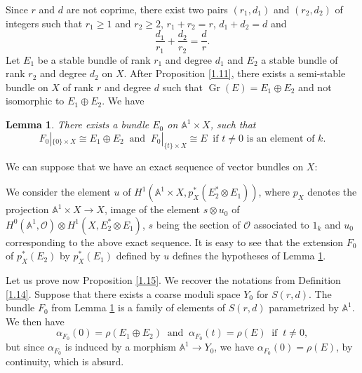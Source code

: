 \documentclass[12pt,a4paper]{book}
\DeclareMathOperator\Gr{Gr}
\def\OO{\mathscr{O}}
\newtheorem{lemma}[thm]{Lemma}
\theoremstyle{definition} \newtheorem{defn}[thm]{Definition}
\theoremstyle{definition} \newtheorem{ejs}[thm]{Examples}
\theoremstyle{definition} \newtheorem{ej}[thm]{Example}
\begin{document}
    Since $r$ and $d$ are not coprime, there exist two pairs $(r_1,d_1)$ and $(r_2,d_2)$ of integers such that $r_1\geq 1$ and $r_2\geq 2$, $r_1+r_2=r$, $d_1+d_2=d$ and 
    \begin{equation*}
      \frac{d_1}{r_1} + \frac{d_2}{r_2}=\frac{d}{r}.
    \end{equation*}
    Let $E_1$ be a stable bundle of rank $r_1$ and degree $d_1$ and $E_2$ a stable bundle of rank $r_2$ and degree $d_2$ on $X$. After Proposition \ref{1.11}, there exists a semi-stable bundle on $X$ of rank $r$ and degree $d$ such that $\Gr(E)=E_1\oplus E_2$ and not isomorphic to $E_1 \oplus E_2$. We have 
    \begin{lemma}\label{1.16}
      There exists a bundle $E_0$ on $\mathbb{A}^1\times X$, such that
      \begin{equation*}
	F_0|_{\{0\}\times X} \cong E_1 \oplus E_2 \ \text{ and } \ F_0|_{\{t\} \times X}\cong E \ \text{ if $t\neq 0$ is an element of $k$.}
      \end{equation*}
      
    \end{lemma}

    We can suppose that we have an exact sequence of vector bundles on $X$:
    \begin{center}
    \end{center}
    We consider the element $u$ of $H^1(\mathbb{A}^1 \times X, p_X^*(E_2^*\otimes E_1))$, where $p_X$ denotes the projection $\mathbb{A}^1 \times X \rightarrow X$, image of the element $s\otimes u_0$ of $H^0(\mathbb{A}^1,\OO) \otimes H^1(X,E_2^*\otimes E_1)$, $s$ being the section of $\OO$ associated to $1_k$ and $u_0$ corresponding to the above exact sequence. It is easy to see that the extension $F_0$ of $p_X^*(E_2)$ by $p_X^*(E_1)$ defined by $u$ defines the hypotheses of Lemma \ref{1.16}.

    Let us prove now Proposition \ref{1.15}.
    We recover the notations from Definition \ref{1.14}. Suppose that there exists a coarse moduli space $Y_0$ for $S(r,d)$. The bundle $F_0$ from Lemma \ref{1.16} is a family of elements of $S(r,d)$ parametrized by $\mathbb{A}^1$. We then have
    \begin{equation*}
      \alpha_{F_0}(0) = \rho(E_1\oplus E_2) \ \text{ and } \ \alpha_{F_0}(t)=\rho(E) \ \text{ if } \ t\neq 0,
    \end{equation*}
    but since $\alpha_{F_0}$ is induced by a morphism $\mathbb{A}^1\rightarrow Y_0$, we have $\alpha_{F_0}(0)=\rho(E)$, by continuity, which is absurd.
\end{document}
